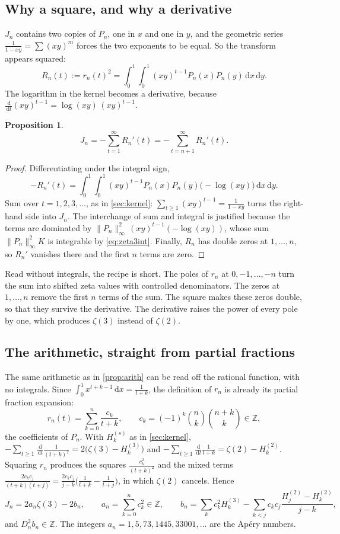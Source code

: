 \documentclass[11pt]{article}
\newcommand{\Z}{\mathbb{Z}}
\newcommand{\dd}{\,\mathrm{d}}
\newcommand{\Dn}{D_n}
\theoremstyle{plain}
\newtheorem{proposition}[theorem]{Proposition}
\theoremstyle{definition}
\theoremstyle{remark}
\begin{document}
\subsection{Why a square, and why a derivative}

$J_n$ contains two copies of $P_n$, one in $x$ and one in $y$, and the geometric series
$\frac1{1-xy}=\sum(xy)^m$ forces the two exponents to be equal. So the transform appears squared:
\[
  R_n(t):=r_n(t)^2=\int_0^1\!\!\int_0^1(xy)^{t-1}P_n(x)P_n(y)\dd x\dd y .
\]
The logarithm in the kernel becomes a derivative, because $\frac{\dd}{\dd t}(xy)^{t-1}=\log(xy)\,(xy)^{t-1}$.

\begin{proposition}\label{prop:sum}
\[
  J_n=-\sum_{t=1}^\infty R_n'(t)=-\sum_{t=n+1}^\infty R_n'(t).
\]
\end{proposition}

\begin{proof}
Differentiating under the integral sign,
\[
  -R_n'(t)=\int_0^1\!\!\int_0^1(xy)^{t-1}P_n(x)P_n(y)\bigl(-\log(xy)\bigr)\dd x\dd y .
\]
Sum over $t=1,2,3,\dots$, as in \cref{sec:kernel}: $\sum_{t\ge1}(xy)^{t-1}=\frac1{1-xy}$
turns the right-hand side into $J_n$. The interchange of sum and integral is justified because the
terms are dominated by $\|P_n\|_\infty^2\,(xy)^{t-1}(-\log(xy))$, whose sum $\|P_n\|_\infty^2K$ is
integrable by \eqref{eq:zeta3int}. Finally, $R_n$ has double zeros at $1,\dots,n$, so $R_n'$
vanishes there and the first $n$ terms are zero.
\end{proof}

Read without integrals, the recipe is short. The poles of $r_n$ at $0,-1,\dots,-n$ turn the sum
into shifted zeta values with controlled denominators. The zeros at $1,\dots,n$ remove the first $n$
terms of the sum. The square makes these zeros double, so that they survive the derivative. The
derivative raises the power of every pole by one, which produces $\zeta(3)$ instead of
$\zeta(2)$.

\subsection{The arithmetic, straight from partial fractions}

The same arithmetic as in \cref{prop:arith} can be read off the rational function, with no
integrals. Since $\int_0^1x^{t+k-1}\dd x=\frac1{t+k}$, the definition of $r_n$ is already its partial
fraction expansion:
\[
  r_n(t)=\sum_{k=0}^n\frac{c_k}{t+k},\qquad c_k=(-1)^k\binom nk\binom{n+k}k\in\Z,
\]
the coefficients of $P_n$. With $H^{(s)}_k$ as in \cref{sec:kernel}, $-\sum_{t\ge1}\frac{\dd}{\dd t}\frac1{(t+k)^2}=2\bigl(\zeta(3)-H^{(3)}_k\bigr)$
and $-\sum_{t\ge1}\frac{\dd}{\dd t}\frac1{t+k}=\zeta(2)-H^{(2)}_k$. Squaring $r_n$ produces the
squares $\frac{c_k^2}{(t+k)^2}$ and the mixed terms
$\frac{2c_kc_j}{(t+k)(t+j)}=\frac{2c_kc_j}{j-k}\bigl(\frac1{t+k}-\frac1{t+j}\bigr)$, in which
$\zeta(2)$ cancels. Hence
\[
  J_n=2a_n\zeta(3)-2b_n,\qquad a_n=\sum_{k=0}^nc_k^2\in\Z,\qquad
  b_n=\sum_kc_k^2H^{(3)}_k-\sum_{k<j}c_kc_j\frac{H^{(2)}_j-H^{(2)}_k}{j-k},
\]
and $\Dn^3b_n\in\Z$. The integers $a_n=1,5,73,1445,33001,\dots$ are the Ap\'ery numbers.
\end{document}
